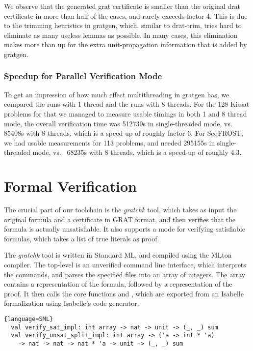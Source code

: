 \documentclass{llncs}     %
\makeatletter
\newcommand{\isai}{\lstinline[language=isabelle,basicstyle=\normalsize\ttfamily\slshape]}
\renewcommand\lstinline[1][]{%
  \leavevmode
  \ifmmode\expandafter\hbox\fi\bgroup
    \def\lst@boxpos{b}%
    \lsthk@PreSet\lstset{flexiblecolumns,#1}%
    \lsthk@TextStyle
    \@ifnextchar\bgroup{\afterassignment\lst@InlineG \let\@let@token}%
                       \lstinline@}
\makeatother
\begin{document}
  We observe that the generated grat certificate is smaller than the original drat certificate in more than half of the cases, and rarely exceeds factor 4.
  This is due to the trimming heuristics in gratgen, which, similar to drat-trim, tries hard to eliminate as many useless lemmas as possible. In many cases, this elimination makes more than up for the extra unit-propagation information that is added by gratgen.

  \subsubsection{Speedup for Parallel Verification Mode}
  To get an impression of how much effect multithreading in gratgen has, we compared the runs with 1 thread and the runs with 8 threads. For the 128 Kissat problems for that we managed to measure usable timings in both 1 and 8 thread mode, the overall verification time was 512739s in single-threaded mode, vs.~ 85408s with 8 threads, which is a speed-up of roughly factor 6. For SeqFROST, we had usable measurements for 113 problems, and needed 295155s in single-threaded mode, vs.~ 68235s with 8 threads, which is a speed-up of roughly 4.3.


\section{Formal Verification}
The crucial part of our toolchain is the {\sl gratchk} tool, which takes as input the original formula and a
certificate in GRAT format, and then verifies that the formula is actually unsatisfiable.
It also supports a mode for verifying satisfiable formulas, which takes a list of true literals as proof.

The {\sl gratchk} tool is written in Standard ML, and compiled using the MLton compiler.
The top-level is an unverified command line interface, which interprets the commands, and parses the specified files
into an array of integers. The array contains a representation of the formula, followed by a representation of the proof.
It then calls the core functions \isai{verify_sat_impl} and \isai{verify_unsat_split_impl}, which are
exported from an Isabelle formalization using Isabelle's code generator.

\begin{lstlisting}{language=SML}
  val verify_sat_impl: int array -> nat -> unit -> (_, _) sum
  val verify_unsat_split_impl: int array -> ('a -> int * 'a)
    -> nat -> nat -> nat * 'a -> unit -> (_, _) sum
\end{lstlisting}
\end{document}
